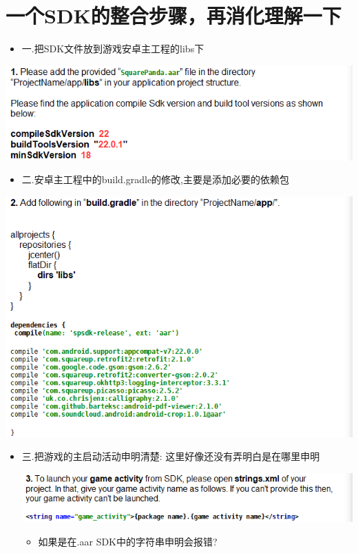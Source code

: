 \documentclass[9pt, b5paper]{article}
\begin{document}
\section{一个SDK的整合步骤，再消化理解一下}
\label{sec-6}
\begin{itemize}
\item 一.把SDK文件放到游戏安卓主工程的libs下
\end{itemize}

\includegraphics[width=.9\linewidth]{./pic/notes_20221220_153025.png}
\begin{itemize}
\item 二.安卓主工程中的build.gradle的修改,主要是添加必要的依赖包
\end{itemize}

\includegraphics[width=.9\linewidth]{./pic/notes_20221220_153107.png}
\begin{itemize}
\item 三.把游戏的主启动活动申明清楚: 这里好像还没有弄明白是在哪里申明

\includegraphics[width=.9\linewidth]{./pic/notes_20221220_153212.png}
\begin{itemize}
\item 如果是在.aar SDK中的字符串申明会报错?
\end{itemize}
\end{itemize}
\end{document}
